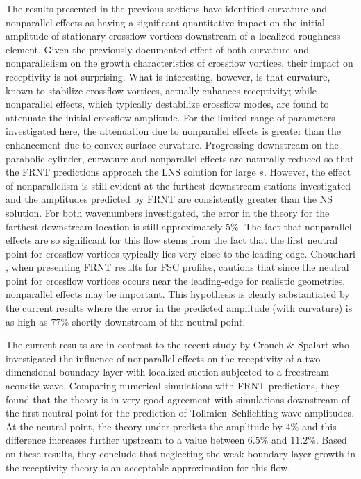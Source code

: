 The results presented in the previous sections have identified curvature and
nonparallel effects as having a significant quantitative impact on the initial
amplitude of stationary crossflow vortices downstream of a localized roughness
element.  Given the previously documented \cite{MaMa:94,MaBa:93} effect of
both curvature and nonparallelism on the growth characteristics of crossflow
vortices, their impact on receptivity is not surprising.  What is interesting,
however, is that curvature, known to stabilize crossflow vortices, actually
enhances receptivity; while nonparallel effects, which typically destabilize
crossflow modes, are found to attenuate the initial crossflow amplitude.  For
the limited range of parameters investigated here, the attenuation due to
nonparallel effects is greater than the enhancement due to convex surface
curvature.  Progressing downstream on the parabolic-cylinder, curvature and
nonparallel effects are naturally reduced so that the FRNT predictions
approach the LNS solution for large $s$.  However, the effect of
nonparallelism is still evident at the furthest downstream stations
investigated and the amplitudes predicted by FRNT are consistently greater
than the NS solution.  For both wavenumbers investigated, the error in the
theory for the farthest downstream location is still approximately $5\%$.  The
fact that nonparallel effects are so significant for this flow stems from the
fact that the first neutral point for crossflow vortices typically lies very
close to the leading-edge.  Choudhari \cite{Choudhari:94}, when presenting
FRNT results for FSC profiles, cautions that since the neutral point for
crossflow vortices occurs near the leading-edge for realistic geometries,
nonparallel effects may be important.  This hypothesis is clearly
substantiated by the current results where the error in the predicted
amplitude (with curvature) is as high as $77\%$ shortly downstream of the
neutral point.

The current results are in contrast to the recent study by Crouch \& Spalart
\cite{CrSp:95} who investigated the influence of nonparallel effects on the
receptivity of a two-dimensional boundary layer with localized suction
subjected to a freestream acoustic wave.  Comparing numerical simulations with
FRNT predictions, they found that the theory is in very good agreement with
simulations downstream of the first neutral point for the prediction of
Tollmien--Schlichting wave amplitudes.  At the neutral point, the theory
under-predicts the amplitude by $4\%$ and this difference increases further
upstream to a value between $6.5\%$ and $11.2\%$.  Based on these results,
they conclude that neglecting the weak boundary-layer growth in the
receptivity theory is an acceptable approximation for this flow.

